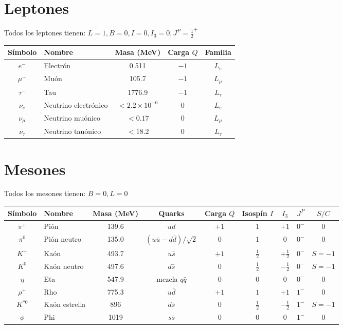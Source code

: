 \documentclass{article}
\begin{document}
\section*{Leptones}

Todos los leptones tienen: $L = 1, B = 0, I = 0, I_3 = 0, J^P = \frac{1}{2}^+$

\begin{longtable}{|c|l|c|c|c|}
\hline
Símbolo & Nombre & Masa (MeV) & Carga $Q$ & Familia \\
\hline
$e^-$ & Electrón & 0.511 & $-1$ & $L_e$ \\
$\mu^-$ & Muón & 105.7 & $-1$ & $L_\mu$ \\
$\tau^-$ & Tau & 1776.9 & $-1$ & $L_\tau$ \\
$\nu_e$ & Neutrino electrónico & $<2.2 \times 10^{-6}$ & $0$ & $L_e$ \\
$\nu_\mu$ & Neutrino muónico & $<0.17$ & $0$ & $L_\mu$ \\
$\nu_\tau$ & Neutrino tauónico & $<18.2$ & $0$ & $L_\tau$ \\
\hline
\end{longtable}

\vspace{1em}
\section*{Mesones}

Todos los mesones tienen: $B = 0, L = 0$

\begin{longtable}{|c|l|c|c|c|c|c|c|c|}
\hline
Símbolo & Nombre & Masa (MeV) & Quarks & Carga $Q$ & Isospín $I$ & $I_3$ & $J^P$ & $S/C$ \\
\hline
$\pi^+$ & Pión & 139.6 & $u\bar{d}$ & $+1$ & $1$ & $+1$ & $0^-$ & $0$ \\
$\pi^0$ & Pión neutro & 135.0 & $(u\bar{u} - d\bar{d})/\sqrt{2}$ & $0$ & $1$ & $0$ & $0^-$ & $0$ \\
$K^+$ & Kaón & 493.7 & $u\bar{s}$ & $+1$ & $\frac{1}{2}$ & $+\frac{1}{2}$ & $0^-$ & $S=-1$ \\
$K^0$ & Kaón neutro & 497.6 & $d\bar{s}$ & $0$ & $\frac{1}{2}$ & $-\frac{1}{2}$ & $0^-$ & $S=-1$ \\
$\eta$ & Eta & 547.9 & mezcla $q\bar{q}$ & $0$ & $0$ & $0$ & $0^-$ & $0$ \\
$\rho^+$ & Rho & 775.3 & $u\bar{d}$ & $+1$ & $1$ & $+1$ & $1^-$ & $0$ \\
$K^{*0}$ & Kaón estrella & 896 & $d\bar{s}$ & $0$ & $\frac{1}{2}$ & $-\frac{1}{2}$ & $1^-$ & $S=-1$ \\
$\phi$ & Phi & 1019 & $s\bar{s}$ & $0$ & $0$ & $0$ & $1^-$ & $0$ \\
\hline
\end{longtable}
\end{document}
